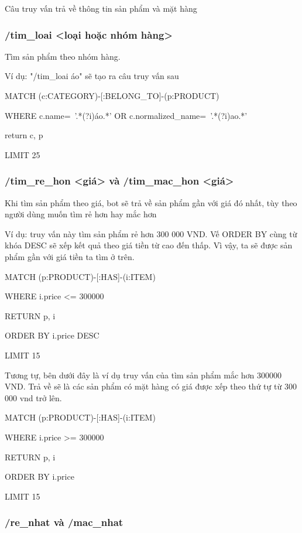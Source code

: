 Câu truy vấn trả về thông tin sản phẩm và mặt hàng 

\subsubsection{/tim\_loai <loại hoặc nhóm hàng> }

Tìm sản phẩm theo nhóm hàng.

Ví dụ: "/tim\_loai áo" sẽ tạo ra câu truy vấn sau
 
MATCH (c:CATEGORY)-[:BELONG\_TO]-(p:PRODUCT)

WHERE c.name=~'.*(?i)áo.*' OR c.normalized\_name=~'.*(?i)ao.*'  

return c, p

LIMIT 25

\smallskip

\subsubsection{/tim\_re\_hon <giá> và /tim\_mac\_hon <giá>}

Khi tìm sản phẩm theo giá, bot sẽ trả về sản phẩm gần với giá đó nhất, tùy theo người dùng muốn tìm rẻ hơn hay mắc hơn 

Ví dụ: truy vấn này tìm sản phẩm rẻ hơn 300 000 VND. Vế ORDER BY cùng từ khóa DESC sẽ xếp kết quả theo giá tiền từ cao đến thấp. Vì vậy, ta sẽ được sản phẩm gần với giá tiền ta tìm ở trên. 

MATCH (p:PRODUCT)-[:HAS]-(i:ITEM)

WHERE i.price <= 300000 

RETURN p, i 

ORDER BY i.price DESC 

LIMIT 15

\smallskip

Tương tự, bên dưới đây là ví dụ truy vấn của tìm sản phẩm mắc hơn 300000 VND. Trả về sẽ là các sản phẩm có mặt hàng có giá được xếp theo thứ tự từ 300 000 vnd trở lên. 

MATCH (p:PRODUCT)-[:HAS]-(i:ITEM)

WHERE i.price >= 300000 

RETURN p, i 

ORDER BY i.price  

LIMIT 15

\smallskip

\subsubsection{/re\_nhat và /mac\_nhat }

